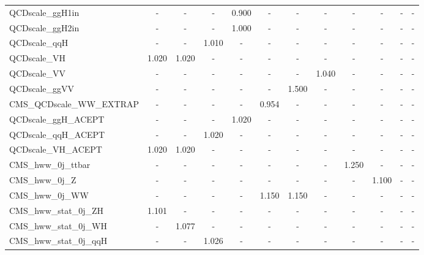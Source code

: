 \begin{table}[!ht]
\begin{center}
{\begin{tabular}{l|c|c|c|c|c|c|c|c|c|c|c|}
QCDscale\_ggH1in	          &   -   &   -   &   -   & 0.900 &   -   &   -   &   -   &   -   &   -   &   -   &   -   \\
QCDscale\_ggH2in	          &   -   &   -   &   -   & 1.000 &   -   &   -   &   -   &   -   &   -   &   -   &   -   \\
QCDscale\_qqH	                  &   -   &   -   & 1.010 &   -   &   -   &   -   &   -   &   -   &   -   &   -   &   -   \\
QCDscale\_VH 	                  & 1.020 & 1.020 &   -   &   -   &   -   &   -   &   -   &   -   &   -   &   -   &   -   \\
QCDscale\_VV 	                  &   -   &   -   &   -   &   -   &   -   &   -   & 1.040 &   -   &   -   &   -   &   -   \\
QCDscale\_ggVV	                  &   -   &   -   &   -   &   -   &   -   & 1.500 &   -   &   -   &   -   &   -   &   -   \\
CMS\_QCDscale\_WW\_EXTRAP         &   -   &   -   &   -   &   -   & 0.954 &   -   &   -   &   -   &   -   &   -   &   -   \\
QCDscale\_ggH\_ACEPT              &   -   &   -   &   -   & 1.020 &   -   &   -   &   -   &   -   &   -   &   -   &   -   \\
QCDscale\_qqH\_ACEPT              &   -   &   -   & 1.020 &   -   &   -   &   -   &   -   &   -   &   -   &   -   &   -   \\
QCDscale\_VH\_ACEPT               & 1.020 & 1.020 &   -   &   -   &   -   &   -   &   -   &   -   &   -   &   -   &   -   \\
CMS\_hww\_0j\_ttbar               &   -   &   -   &   -   &   -   &   -   &   -   &   -   & 1.250 &   -   &   -   &   -   \\
CMS\_hww\_0j\_Z                   &   -   &   -   &   -   &   -   &   -   &   -   &   -   &   -   & 1.100 &   -   &   -   \\
CMS\_hww\_0j\_WW                  &   -   &   -   &   -   &   -   & 1.150 & 1.150 &   -   &   -   &   -   &   -   &   -   \\
CMS\_hww\_stat\_0j\_ZH            & 1.101 &   -   &   -   &   -   &   -   &   -   &   -   &   -   &   -   &   -   &   -   \\
CMS\_hww\_stat\_0j\_WH            &   -   & 1.077 &   -   &   -   &   -   &   -   &   -   &   -   &   -   &   -   &   -   \\
CMS\_hww\_stat\_0j\_qqH           &   -   &   -   & 1.026 &   -   &   -   &   -   &   -   &   -   &   -   &   -   &   -   \\

\end{tabular}}
\end{center}
\end{table}
